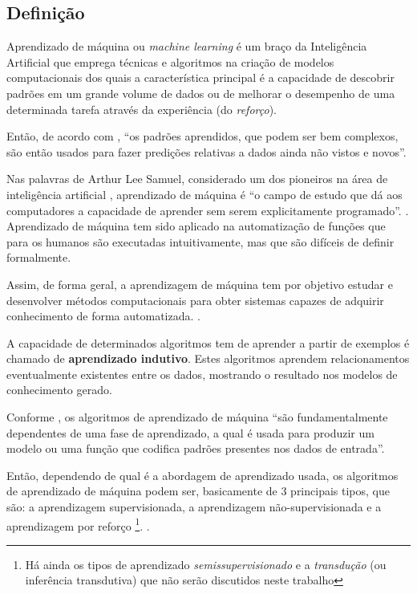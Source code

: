 \subsection{Definição}
Aprendizado de máquina ou \textit{machine learning} é um braço da Inteligência Artificial que emprega técnicas e algoritmos na criação de modelos computacionais dos quais a característica principal é a capacidade de descobrir padrões em um grande volume de dados ou de melhorar o desempenho de uma determinada tarefa através da experiência (do \textit{reforço}).\cite{mohri_foundations_2018} \cite{alpaydin_introduction_2014} \cite{swamynathan_mastering_2019}

Então, de acordo com \cite[p. 278]{baeza-yates_recuperacao_2013}, ``os padrões aprendidos, que podem ser bem complexos, são então usados para fazer predições relativas a dados ainda não vistos e novos''.

Nas palavras de Arthur Lee Samuel, considerado um dos pioneiros na área de inteligência artificial \cite{wiederhold_arthur_1992}, aprendizado de máquina é ``o campo de estudo que dá aos computadores a capacidade de aprender sem serem explicitamente programado''. \cite[p. 89]{simon_too_2013}. Aprendizado de máquina tem sido aplicado na automatização de funções que para os humanos são executadas intuitivamente, mas que são difíceis de definir formalmente. \cite{sarkar_2017}

Assim, de forma geral, a aprendizagem de máquina tem por objetivo estudar e desenvolver métodos computacionais para obter sistemas capazes de adquirir conhecimento de forma automatizada. \cite{lima_ia_2016}.

A capacidade de determinados algoritmos tem de aprender a partir de exemplos é chamado de \textbf{aprendizado indutivo}. Estes algoritmos aprendem relacionamentos eventualmente existentes entre os dados, mostrando o resultado nos modelos de conhecimento gerado. \cite{goldschmidt2005}\cite{alpaydin_introduction_2014}

Conforme \cite[p. 279]{baeza-yates_recuperacao_2013}, os algoritmos de aprendizado de máquina ``são fundamentalmente dependentes de uma fase de aprendizado, a qual é usada para produzir um modelo ou uma função que codifica padrões presentes nos dados de entrada''.

Então, dependendo de qual é a abordagem de aprendizado usada, os algoritmos de aprendizado de máquina podem ser, basicamente de 3 principais tipos, que são: a aprendizagem supervisionada, a aprendizagem não-supervisionada e a aprendizagem por reforço \footnote{Há ainda os tipos de aprendizado \textit{semissupervisionado} e a \textit{transdução} (ou inferência transdutiva) que não serão discutidos neste trabalho}. \cite{Norvig2013} \cite{baeza-yates_recuperacao_2013}. 

